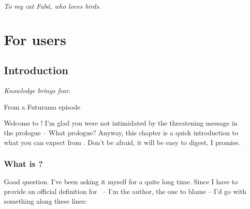 \documentclass[a4paper,twoside,12pt]{memoir}
\begin{document}
\cleardoublepage

\vspace*{25em}

\begin{flushright}
\em To my cat Fubá, who loves birds.
\end{flushright}

\cleardoublepage

\tableofcontents*

\cleardoublepage

\listoffigures*

\cleardoublepage

\listoftables*

\cleardoublepage

\listofcodes*


\mainmatter

\part{For users}
\label{part:users}

\chapter{Introduction}
\label{chap:intro}

\epigraph{\emph{Knowledge brings fear.}}{From a Futurama episode}

Welcome to \arara! I'm glad you were not intimidated by the threatening message in the prologue -- What prologue? Anyway, this chapter is a quick introduction to what you can expect from \arara. Don't be afraid, it will be easy to digest, I promise.

\section{What is \texorpdfstring{\arara}{arara}?}
\label{sec:whatisarara}

Good question. I've been asking it myself for a quite long time. Since I have to provide an official definition for \arara \ -- I'm the author, the one to blame -- I'd go with something along these lines:
\end{document}
